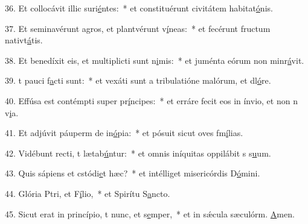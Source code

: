 36. Et collocávit illic suri\uline{é}ntes:~* et constituérunt civitátem habitat\uline{ó}nis.\par 
37. Et seminavérunt agros, et plantvérunt v\uline{í}neas:~* et fecérunt fructum nativt\uline{á}tis.\par 
38. Et benedíxit eis, et multiplicti sunt n\uline{i}mis:~* et juménta eórum non minr\uline{á}vit.\par 
39. t pauci f\uline{a}cti sunt:~* et vexáti sunt a tribulatióne malórum, et dl\uline{ó}re.\par 
40. Effúsa est contémpti super pr\uline{í}ncipes:~* et erráre fecit eos in ínvio, et non n v\uline{i}a.\par 
41. Et adjúvit páuperm de in\uline{ó}pia:~* et pósuit sicut oves fm\uline{í}lias.\par 
42. Vidébunt recti, t lætab\uline{ú}ntur:~* et omnis iníquitas oppilábit s s\uline{u}um.\par 
43. Quis sápiens et cstódi\uline{e}t hæc?~* et intélliget misericórdis D\uline{ó}mini.\par 
44. Glória Ptri, et F\uline{í}lio,~* et Spirítu S\uline{a}ncto.\par 
45. Sicut erat in princípio, t nunc, et s\uline{e}mper,~* et in sǽcula sæculórm. \uline{A}men.\par 
